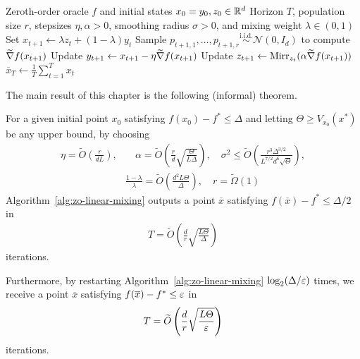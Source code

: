 \begin{algorithm}[H]
    \caption{Population-\(r\) Zeroth-Order Linear Mixing}
    \label{alg:zo-linear-mixing}
    \begin{algorithmic}
        \Require Zeroth-order oracle $f$ and initial states $x_0=y_0,z_0\in\mathbb{R}^d$
        \Require Horizon $T$, population size $r$, stepsizes $\eta,\alpha>0$, smoothing radius $\sigma>0$, and mixing weight $\lambda\in(0,1)$
            \State Set $x_{t+1}\gets \lambda z_t+(1-\lambda)y_t$
            \State Sample $p_{t+1,1},\ldots,p_{t+1,r}\overset{\mathrm{i.i.d.}}{\sim}\mathcal N(0,I_d)$ to compute $\widetilde{\nabla} f(x_{t+1})$
            \State Update $y_{t+1}\gets x_{t+1}-\eta \widetilde{\nabla} f(x_{t+1})$
            \State Update $z_{t+1}\gets\mathrm{Mirr}_{z_t}(\alpha \widetilde{\nabla} f(x_{t+1}))$
        \EndFor
        \State \Return $\displaystyle \overline x_T\gets\frac1T\sum_{t=1}^T x_t$
    \end{algorithmic}
\end{algorithm}
The main result of this chapter is the following (informal) theorem.
\begin{theorem}[informal]
    For a given initial point $x_0$ satisfying $f(x_0) - f^* \leq \Delta$ and letting $\Theta \geq V_{x_0}(x^*)$ be any upper bound, by choosing
    \begin{align*}
        \eta = \widetilde{O}\left(\frac{r}{dL} \right),& \quad \alpha = \widetilde{O}\left(\frac{r}{d} \sqrt{\frac{\Theta}{L \Delta}} \right), \quad \sigma^2 \leq \widetilde{O}\left(\frac{r^3 \Delta^{3/2}}{L^{7/2} d^6 \sqrt{\Theta}}\right), 
        \\&\frac{1-\lambda}{\lambda} = \widetilde{O}\left(\frac{d^2 L \Theta}{\Delta}\right), \quad r = \widetilde{\Omega}(1)
    \end{align*}
    Algorithm~\ref{alg:zo-linear-mixing} outputs a point $\overline x$ satisfying $f(\overline x) - f^* \leq \Delta/2$ in
    \begin{align*}
        T = \widetilde{O}\left(\frac{d}{r} \sqrt{\frac{L\Theta}{\Delta}}\right)
    \end{align*}
    iterations. 

    Furthermore, by restarting Algorithm~\ref{alg:zo-linear-mixing} $\log_2(\Delta/\varepsilon)$ times, we receive a point $\overline x$ satisfying $f(\overline x) - f^* \leq \varepsilon$ in
    \begin{align*}
        T =\widetilde{O}\left(\frac{d}{r} \sqrt{\frac{L\Theta}{\varepsilon}}\right)
    \end{align*}
    iterations. 
\end{theorem}

